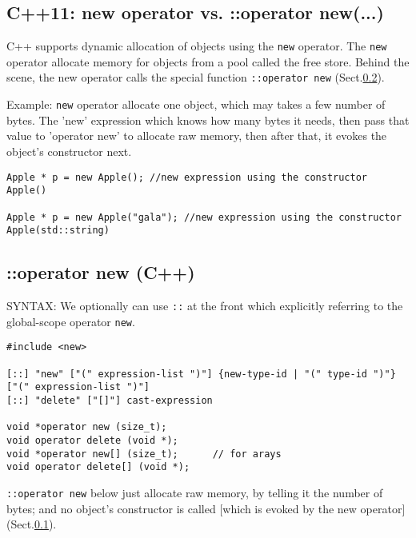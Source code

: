  
\subsection{C++11: new operator  vs. ::operator new(...) }
\label{sec:new-operator}

C++ supports dynamic allocation of objects using the \verb!new! operator. The \verb!new!
operator allocate memory for objects from a pool called the free store. Behind the scene, the new
operator calls the special function \verb!::operator new! (Sect.\ref{sec:operator-new-C++}).
 
Example: \verb!new! operator allocate one object, which may takes a few number
of bytes.
The 'new' expression which knows how many bytes it needs, then pass that value
to 'operator new' to allocate raw memory, then after that, it evokes the object's constructor next.

\begin{verbatim}
Apple * p = new Apple(); //new expression using the constructor Apple()
 
Apple * p = new Apple("gala"); //new expression using the constructor Apple(std::string)

\end{verbatim}

  
\subsection{::operator new (C++)}
\label{sec:operator-new-C++}


SYNTAX: We optionally can use \verb!::! at the front which explicitly referring to the global-scope operator 
\verb!new!.
\begin{verbatim}
#include <new>

[::] "new" ["(" expression-list ")"] {new-type-id | "(" type-id ")"} ["(" expression-list ")"]
[::] "delete" ["[]"] cast-expression

void *operator new (size_t);
void operator delete (void *);
void *operator new[] (size_t);      // for arays
void operator delete[] (void *);
\end{verbatim}

\verb!::operator new! below just allocate raw memory, by telling it the number
of bytes; and no object's constructor is called [which is evoked by the new
operator] (Sect.\ref{sec:new-operator}).

